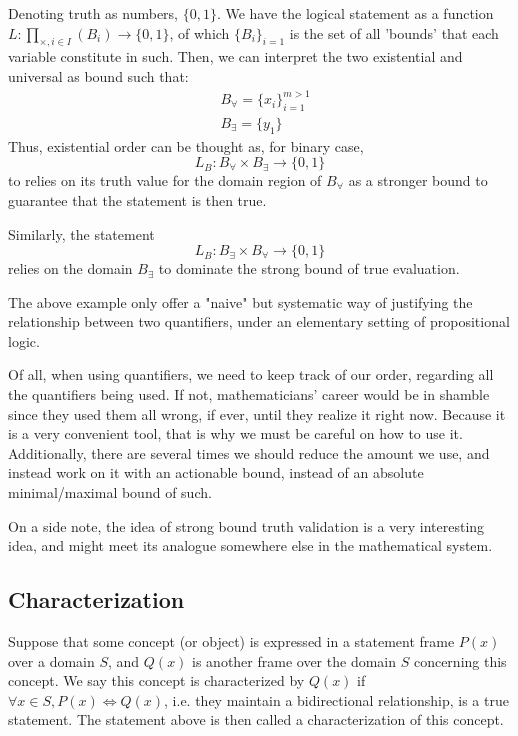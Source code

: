 \begin{example}
    Denoting truth as numbers, $\{0,1\}$. We have the logical statement as a function $L: \prod_{\times, i \in I} (B_i) \to \{0,1\}$, of which $\{B_i\}_{i=1}$ is the set of all 'bounds' that each variable constitute in such. Then, we can interpret the two existential and universal as bound such that: 
    \begin{align}
        & B_{\forall} = \{x_i\}_{i=1}^{m>1}\\
        & B_{\exists} = \{y_1\} 
    \end{align}
    Thus, existential order can be thought as, for binary case, 
    \begin{equation}
        L_B: B_{\forall} \times B_{\exists} \to \{0,1\} 
    \end{equation}
    to relies on its truth value for the domain region of $B_{\forall}$ as a stronger bound to guarantee that the statement is then true. 

    Similarly, the statement 
    \begin{equation}
        L_B: B_{\exists} \times B_{\forall} \to \{0,1\} 
    \end{equation}
    relies on the domain $B_{\exists}$ to dominate the strong bound of true evaluation. 
\end{example}

The above example only offer a "naive" but systematic way of justifying the relationship between two quantifiers, under an elementary setting of propositional logic. 

Of all, when using quantifiers, we need to keep track of our order, regarding all the quantifiers being used. If not, mathematicians' career would be in shamble since they used them all wrong, if ever, until they realize it right now. Because it is a very convenient tool, that is why we must be careful on how to use it. Additionally, there are several times we should reduce the amount we use, and instead work on it with an actionable bound, instead of an absolute minimal/maximal bound of such. 

On a side note, the idea of strong bound truth validation is a very interesting idea, and might meet its analogue somewhere else in the mathematical system. 

\subsection{Characterization}
Suppose that some concept (or object) is expressed in a statement frame $P(x)$ over a domain $S$, and $Q(x)$ is another frame over the domain $S$ concerning this concept. We say this concept is characterized by $Q(x)$ if $\forall x\in S, P(x)\iff Q(x)$, i.e. they maintain a bidirectional relationship, is a true statement. The statement above is then called a characterization  of this concept.

